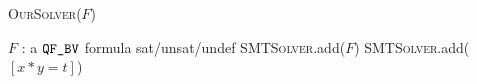 \begin{algorithm}[t]
 \caption{\textsc{OurSolver}($F$)}
 \label{alg:solver}
 \begin{algorithmic}[1]
   \Require $F$ : a $\texttt{QF\_BV}$ formula
   \Ensure sat/unsat/undef
   \State \textsc{SMTSolver}.add($F$)
   \State \textsc{SMTSolver}.add($[x*y = t]$)
   \EndFor
   \EndIf
   \EndFor
   \State {}
 \end{algorithmic}
\end{algorithm}  


